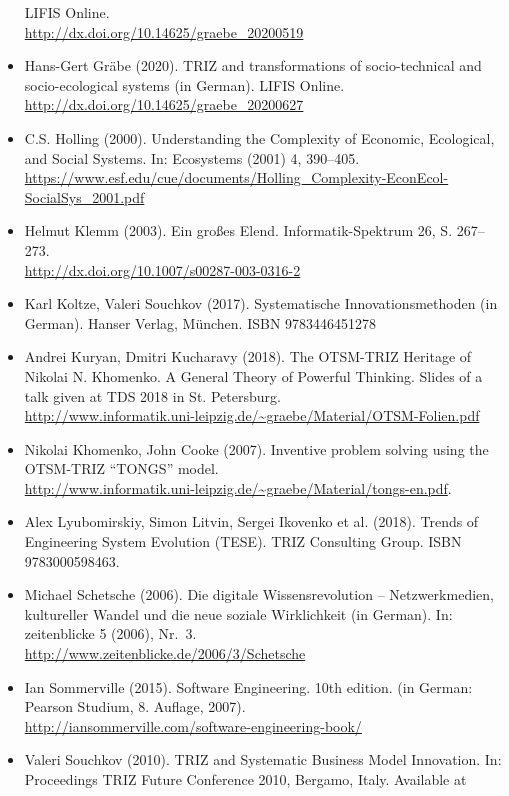 \documentclass[11pt,a4paper]{article}
\begin{document}
\begin{itemize}
  LIFIS Online.\\ \url{http://dx.doi.org/10.14625/graebe_20200519}
\item Hans-Gert Gräbe (2020). TRIZ and transformations of socio-technical and
  socio-ecologi\-cal systems (in German). LIFIS Online.\\
  \url{http://dx.doi.org/10.14625/graebe_20200627}
\item C.S. Holling (2000). Understanding the Complexity of Economic,
  Ecological, and Social Systems. In: Ecosystems (2001) 4, 390–405.
  \url{https://www.esf.edu/cue/documents/Holling_Complexity-EconEcol-SocialSys_2001.pdf}
\item Helmut Klemm (2003). Ein großes Elend. Informatik-Spektrum 26,
  S. 267–273. \\ \url{http://dx.doi.org/10.1007/s00287-003-0316-2}
\item Karl Koltze, Valeri Souchkov (2017). Systematische Innovationsmethoden
  (in German).  Hanser Verlag, München. ISBN 9783446451278
\item Andrei Kuryan, Dmitri Kucharavy (2018). The OTSM-TRIZ Heritage of
  Nikolai N. Khomenko. A General Theory of Powerful Thinking. Slides of a talk
  given at TDS 2018 in St. Petersburg.  \\
  \url{http://www.informatik.uni-leipzig.de/~graebe/Material/OTSM-Folien.pdf}
\item Nikolai Khomenko, John Cooke (2007). Inventive problem solving using the
  OTSM-TRIZ “TONGS” model.\\
  \url{http://www.informatik.uni-leipzig.de/~graebe/Material/tongs-en.pdf}.
\item Alex Lyubomirskiy, Simon Litvin, Sergei Ikovenko et al. (2018). Trends
  of Engineering System Evolution (TESE).  TRIZ Consulting Group. ISBN
  9783000598463.
\item Michael Schetsche (2006). Die digitale Wissensrevolution –
  Netzwerkmedien, kultureller Wandel und die neue soziale Wirklichkeit (in
  German). In: zeitenblicke 5 (2006), Nr.~3.\\
  \url{http://www.zeitenblicke.de/2006/3/Schetsche} 
\item Ian Sommerville (2015). Software Engineering. 10th edition.  (in German:
  Pearson Studium, 8. Auf\-lage, 2007).\\
  \url{http://iansommerville.com/software-engineering-book/}
\item Valeri Souchkov (2010).  TRIZ and Systematic Business Model Innovation.
  In: Proceedings TRIZ Future Conference 2010, Bergamo, Italy.  Available at

\end{itemize}
\end{document}
